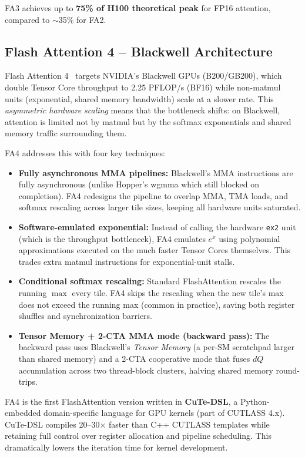 FA3 achieves up to \textbf{75\% of H100 theoretical peak} for FP16 attention, compared to $\sim$35\% for FA2.

\subsection{Flash Attention 4 -- Blackwell Architecture}
\label{flash-attention-4-blackwell-architecture}

Flash Attention 4~\cite{zadouri2026flashattention4} targets NVIDIA’s Blackwell GPUs (B200/GB200), which double Tensor Core throughput to 2.25 PFLOP/s (BF16) while non-matmul units (exponential, shared memory bandwidth) scale at a slower rate. This \emph{asymmetric hardware scaling} means that the bottleneck shifts: on Blackwell, attention is limited not by matmul but by the softmax exponentials and shared memory traffic surrounding them.

FA4 addresses this with four key techniques:

\begin{itemize}
  \item \textbf{Fully asynchronous MMA pipelines:} Blackwell’s MMA instructions are fully asynchronous (unlike Hopper’s wgmma which still blocked on completion). FA4 redesigns the pipeline to overlap MMA, TMA loads, and softmax rescaling across larger tile sizes, keeping all hardware units saturated.
  \item \textbf{Software-emulated exponential:} Instead of calling the hardware \texttt{ex2} unit (which is the throughput bottleneck), FA4 emulates $e^x$ using polynomial approximations executed on the much faster Tensor Cores themselves. This trades extra matmul instructions for exponential-unit stalls.
  \item \textbf{Conditional softmax rescaling:} Standard FlashAttention rescales the running $\max$ every tile. FA4 skips the rescaling when the new tile’s max does not exceed the running max (common in practice), saving both register shuffles and synchronization barriers.
  \item \textbf{Tensor Memory + 2-CTA MMA mode (backward pass):} The backward pass uses Blackwell’s \emph{Tensor Memory} (a per-SM scratchpad larger than shared memory) and a 2-CTA cooperative mode that fuses $dQ$ accumulation across two thread-block clusters, halving shared memory round-trips.
\end{itemize}

\begin{keybox}
FA4 is the first FlashAttention version written in \textbf{CuTe-DSL}, a Python-embedded domain-specific language for GPU kernels (part of CUTLASS 4.x). CuTe-DSL compiles 20--30$\times$ faster than C++ CUTLASS templates while retaining full control over register allocation and pipeline scheduling. This dramatically lowers the iteration time for kernel development.
\end{keybox}


